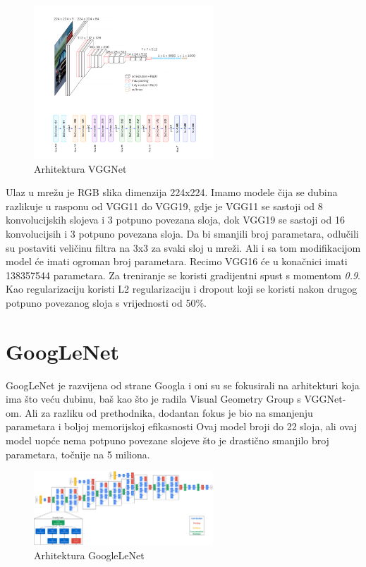 \FloatBarrier
\begin{figure}[h]
    \centering
    \includegraphics[width=0.6\textwidth]{images/VGGNet}
    \caption{Arhitektura VGGNet}
    \label{fig:slika10}
\end{figure}
\FloatBarrier

Ulaz u mrežu je RGB slika dimenzija 224x224.
Imamo modele čija se dubina razlikuje u rasponu od VGG11 do VGG19, gdje je VGG11 se sastoji od 8 konvolucijskih slojeva i 3 potpuno povezana sloja, dok VGG19 se sastoji od 16 konvolucijsih i 3 potpuno povezana sloja.
Da bi smanjili broj parametara, odlučili su postaviti veličinu filtra na 3x3 za svaki sloj u mreži.
Ali i sa tom modifikacijom model će imati ogroman broj parametara.
Recimo VGG16 će u konačnici imati 138357544 parametara.
Za treniranje se koristi gradijentni spust s momentom \emph{0.9}.
Kao regularizaciju koristi L2 regularizaciju i dropout koji se koristi nakon drugog potpuno povezanog sloja s vrijednosti od 50\%.

\section{GoogLeNet}\label{sec:googlenet}
GoogLeNet je razvijena od strane Googla i oni su se fokusirali na arhitekturi koja ima što veću dubinu, baš kao što je radila Visual Geometry Group s VGGNet-om.
Ali za razliku od prethodnika, dodantan fokus je bio na smanjenju parametara i boljoj memorijskoj efikasnosti
Ovaj model broji do 22 sloja, ali ovaj model uopće nema potpuno povezane slojeve što je drastično smanjilo broj parametara, točnije na 5 miliona.

\FloatBarrier
\begin{figure}[h]
    \centering
    \includegraphics[width=0.6\textwidth]{images/GoogLeNet}
    \caption{Arhitektura GoogleLeNet}
    \label{fig:slika11}
\end{figure}
\FloatBarrier

